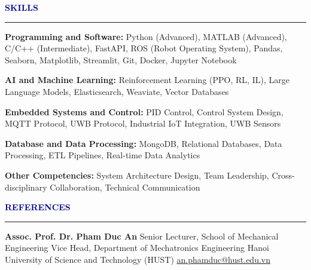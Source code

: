 \documentclass[11pt,letterpaper]{article}
\newcommand{\section}[1]{
  \vspace{0.3em}
  {\large\textbf{\textcolor{darkblue}{#1}}}
  \vspace{0.2em}
  \hrule
  \vspace{0.3em}
}
\begin{document}
\section{SKILLS}

\textbf{Programming and Software:} Python (Advanced), MATLAB (Advanced), C/C++ (Intermediate), FastAPI, ROS (Robot Operating System), Pandas, Seaborn, Matplotlib, Streamlit, Git, Docker, Jupyter Notebook

\vspace{0.2em}
\textbf{AI and Machine Learning:} Reinforcement Learning (PPO, RL, IL), Large Language Models, Elasticsearch, Weaviate, Vector Databases

\vspace{0.2em}
\textbf{Embedded Systems and Control:} PID Control, Control System Design, MQTT Protocol, UWB Protocol, Industrial IoT Integration, UWB Sensors

\vspace{0.2em}
\textbf{Database and Data Processing:} MongoDB, Relational Databases, Data Processing, ETL Pipelines, Real-time Data Analytics

\vspace{0.2em}
\textbf{Other Competencies:} System Architecture Design, Team Leadership, Cross-disciplinary Collaboration, Technical Communication


\section{REFERENCES}

\textbf{Assoc. Prof. Dr. Pham Duc An}
\newline
Senior Lecturer, School of Mechanical Engineering
\newline
Vice Head, Department of Mechatronics Engineering
\newline
Hanoi University of Science and Technology (HUST)
\newline
\href{mailto:an.phamduc@hust.edu.vn}{an.phamduc@hust.edu.vn}
\end{document}
